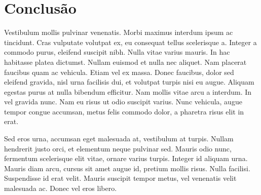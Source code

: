 \chapter[Conclusão]{Conclusão}

Vestibulum mollis pulvinar venenatis. Morbi maximus interdum ipsum ac tincidunt. Cras vulputate volutpat ex, eu consequat tellus scelerisque a. Integer a commodo purus, eleifend suscipit nibh. Nulla vitae varius mauris. In hac habitasse platea dictumst. Nullam euismod et nulla nec aliquet. Nam placerat faucibus quam ac vehicula. Etiam vel ex massa. Donec faucibus, dolor sed eleifend gravida, nisl urna facilisis dui, et volutpat turpis nisi eu augue. Aliquam egestas purus at nulla bibendum efficitur. Nam mollis vitae arcu a interdum. In vel gravida nunc. Nam eu risus ut odio suscipit varius. Nunc vehicula, augue tempor congue accumsan, metus felis commodo dolor, a pharetra risus elit in erat.

Sed eros urna, accumsan eget malesuada at, vestibulum at turpis. Nullam hendrerit justo orci, et elementum neque pulvinar sed. Mauris odio nunc, fermentum scelerisque elit vitae, ornare varius turpis. Integer id aliquam urna. Mauris diam arcu, cursus sit amet augue id, pretium mollis risus. Nulla facilisi. Suspendisse id erat velit. Mauris suscipit tempor metus, vel venenatis velit malesuada ac. Donec vel eros libero.